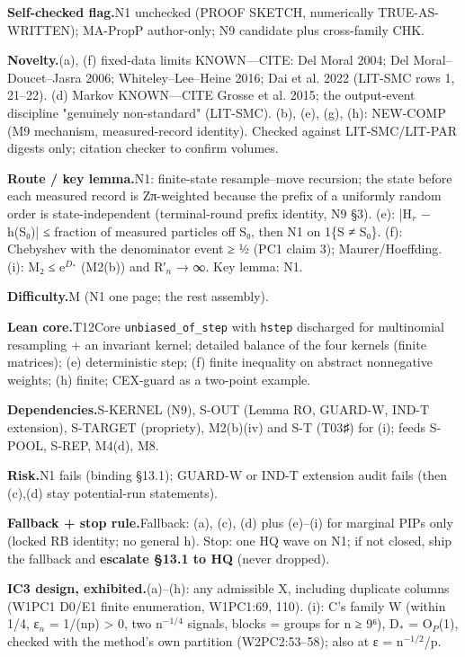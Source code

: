 {\par\smallskip\noindent\textbf{Self-checked flag.}\enspace N1 unchecked (PROOF SKETCH, numerically TRUE-AS-WRITTEN); MA-PropP author-only; N9 candidate plus cross-family CHK.
\par\smallskip\noindent\textbf{Novelty.}\enspace (a), (f) fixed-data limits KNOWN—CITE: Del Moral 2004; Del Moral–Doucet–Jasra 2006; Whiteley–Lee–Heine 2016; Dai et al. 2022 (LIT-SMC rows 1, 21–22). (d) Markov KNOWN—CITE Grosse et al. 2015; the output-event discipline "genuinely non-standard" (LIT-SMC). (b), (e), (g), (h): NEW-COMP (M9 mechanism, measured-record identity). Checked against LIT-SMC/LIT-PAR digests only; citation checker to confirm volumes.
\par\smallskip\noindent\textbf{Route / key lemma.}\enspace N1: finite-state resample–move recursion; the state before each measured record is Zπ-weighted because the prefix of a uniformly random order is state-independent (terminal-round prefix identity, N9 §3). (e): |H$_{r}$ − h(S₀)| ≤ fraction of measured particles off S₀, then N1 on 1\{S ≠ S₀\}. (f): Chebyshev with the denominator event ≥ ½ (PC1 claim 3); Maurer/Hoeffding. (i): M₂ ≤ e$^{D_{*}}$ (M2(b)) and R′$_{n}$ → ∞. Key lemma: N1.
\par\smallskip\noindent\textbf{Difficulty.}\enspace M (N1 one page; the rest assembly).
\par\smallskip\noindent\textbf{Lean core.}\enspace T12Core \texttt{unbiased\_of\_step} with \texttt{hstep} discharged for multinomial resampling + an invariant kernel; detailed balance of the four kernels (finite matrices); (e) deterministic step; (f) finite inequality on abstract nonnegative weights; (h) finite; CEX-guard as a two-point example.
\par\smallskip\noindent\textbf{Dependencies.}\enspace S-KERNEL (N9), S-OUT (Lemma RO, GUARD-W, IND-T extension), S-TARGET (propriety), M2(b)(iv) and S-T (T03♯) for (i); feeds S-POOL, S-REP, M4(d), M8.
\par\smallskip\noindent\textbf{Risk.}\enspace N1 fails (binding §13.1); GUARD-W or IND-T extension audit fails (then (c),(d) stay potential-run statements).
\par\smallskip\noindent\textbf{Fallback + stop rule.}\enspace Fallback: (a), (c), (d) plus (e)–(i) for marginal PIPs only (locked RB identity; no general h). Stop: one HQ wave on N1; if not closed, ship the fallback and \textbf{escalate §13.1 to HQ} (never dropped).
\par\smallskip\noindent\textbf{IC3 design, exhibited.}\enspace (a)–(h): any admissible X, including duplicate columns (W1PC1 D0/E1 finite enumeration, W1PC1:69, 110). (i): C's family W (within 1/4, ε$_{n}$ = 1/(np) \textgreater{} 0, two n$^{−1/4}$ signals, blocks = groups for n ≥ 9⁶), D$_{*}$ = O$_{P}$(1), checked with the method's own partition (W2PC2:53–58); also at ε = n$^{−1/2}$/p.
}
